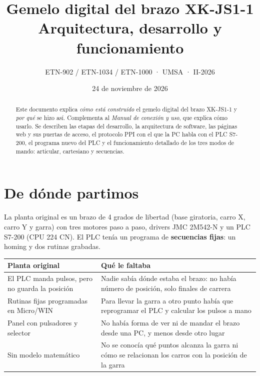 \documentclass[a4paper,11pt]{article}
\title{\textbf{Gemelo digital del brazo XK-JS1-1}\\[4pt]\large Arquitectura, desarrollo y funcionamiento}
\author{ETN-902 / ETN-1034 / ETN-1000 · UMSA · II-2026}
\date{24 de noviembre de 2026}
\begin{document}
\maketitle
\thispagestyle{fancy}

\begin{abstract}
Este documento explica \emph{cómo está construido} el gemelo digital del brazo XK-JS1-1 y \emph{por qué} se hizo así. Complementa al \emph{Manual de conexión y uso}, que explica cómo usarlo. Se describen las etapas del desarrollo, la arquitectura de software, las páginas web y sus puertas de acceso, el protocolo PPI con el que la PC habla con el PLC S7-200, el programa nuevo del PLC y el funcionamiento detallado de los tres modos de mando: articular, cartesiano y secuencias.
\end{abstract}

\tableofcontents
\newpage

\section{De dónde partimos}

La planta original es un brazo de 4 grados de libertad (base giratoria, carro X, carro Y y garra) con tres motores paso a paso, drivers JMC 2M542-N y un PLC S7-200 (CPU 224 CN). El PLC tenía un programa de \textbf{secuencias fijas}: un homing y dos rutinas grabadas.

\begin{center}\small
\begin{tabularx}{\linewidth}{>{\raggedright}p{4.6cm} >{\raggedright\arraybackslash}X}
\toprule
\textbf{Planta original} & \textbf{Qué le faltaba}\\
\midrule
El PLC manda pulsos, pero no guarda la posición & Nadie sabía dónde estaba el brazo: no había número de posición, solo finales de carrera\\
Rutinas fijas programadas en Micro/WIN & Para llevar la garra a otro punto había que reprogramar el PLC y calcular los pulsos a mano\\
Panel con pulsadores y selector & No había forma de ver ni de mandar el brazo desde una PC, y menos desde otro lugar\\
Sin modelo matemático & No se conocía qué puntos alcanza la garra ni cómo se relacionan los carros con la posición de la garra\\
\bottomrule
\end{tabularx}
\end{center}
\end{document}
